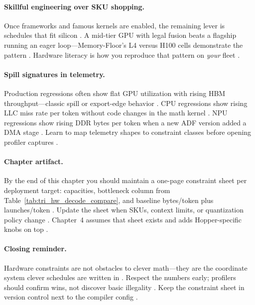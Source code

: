 \paragraph{Skillful engineering over SKU shopping.}
Once frameworks and famous kernels are enabled, the remaining lever is schedules that fit silicon \citep{yirage2026,memoryfloor2026}.
A mid-tier GPU with legal fusion beats a flagship running an eager loop---Memory-Floor's L4 versus H100 cells demonstrate the pattern \citep{memoryfloor2026,taxbreak2026}.
Hardware literacy is how you reproduce that pattern on \emph{your} fleet \citep{patel2025llminference}.

\paragraph{Spill signatures in telemetry.}
Production regressions often show flat GPU utilization with rising HBM throughput---classic spill or export-edge behavior \citep{memoryfloor2026,nvidia2022hopper}.
CPU regressions show rising LLC miss rate per token without code changes in the math kernel \citep{dlbook,patel2025llminference}.
NPU regressions show rising DDR bytes per token when a new ADF version added a DMA stage \citep{amd2024xdna,yirage2026}.
Learn to map telemetry shapes to constraint classes before opening profiler captures \citep{taxbreak2026,memoryfloor2026}.

\paragraph{Chapter artifact.}
By the end of this chapter you should maintain a one-page constraint sheet per deployment target: capacities, bottleneck column from Table~\ref{tab:tri_hw_decode_compare}, and baseline bytes/token plus launches/token \citep{patel2025llminference,taxbreak2026}.
Update the sheet when SKUs, context limits, or quantization policy change \citep{yirage2026,memoryfloor2026}.
Chapter~4 assumes that sheet exists and adds Hopper-specific knobs on top \citep{nvidia2022hopper,semianalysis2024tma}.

\paragraph{Closing reminder.}
Hardware constraints are not obstacles to clever math---they are the coordinate system clever schedules are written in \citep{chen2020compilerbasedhardw,yirage2026}.
Respect the numbers early; profilers should confirm wins, not discover basic illegality \citep{memoryfloor2026,patel2025llminference}.
Keep the constraint sheet in version control next to the compiler config \citep{yirage2026}.


